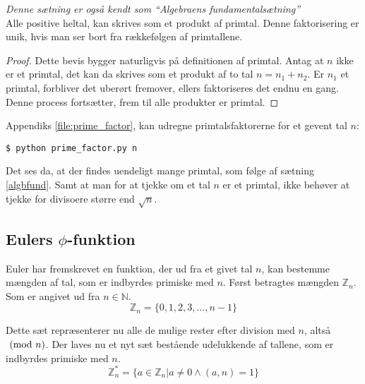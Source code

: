 %



\begin{sent}%
    \emph{Denne sætning er også kendt som ``Algebraens fundamentalsætning''}\\
    Alle positive heltal, kan skrives som et produkt af primtal.
    Denne faktorisering er unik, hvis man ser bort fra rækkefølgen af primtallene.
    \label{algbfund}
\end{sent}

\begin{proof}
    Dette bevis bygger naturligvis på definitionen af primtal.
    Antag at \(n\) ikke er et primtal, det kan da skrives som et produkt af to tal \(n = n_1 + n_2\).
    Er \(n_1\) et primtal, forbliver det uberørt fremover, ellers faktoriseres det endnu en gang.
    Denne process fortsætter, frem til alle produkter er primtal.
\end{proof}

Appendiks \ref{file:prime_factor}, kan udregne primtalsfaktorerne for et gevent tal \(n\):
\begin{verbatim}
$ python prime_factor.py n
\end{verbatim}

Det ses da, at der findes uendeligt mange primtal, som følge af sætning \ref{algbfund}.
Samt at man for at tjekke om et tal \(n\) er et primtal, ikke behøver at tjekke for divisoere større end \(\sqrt{n}\).


\subsection{Eulers \texorpdfstring{\(\phi\)}{Lg}-funktion}
Euler har fremskrevet en funktion, der ud fra et givet tal \(n\), kan bestemme mængden af tal, som er indbyrdes primiske med \(n\).
Først betragtes mængden \(\mathbb{Z}_n\). Som er angivet ud fra \(n \in \mathbb{N}\).
\[\mathbb{Z}_n = \{0, 1, 2, 3, \hdots, n-1 \}\]

Dette sæt repræsenterer nu alle de mulige rester efter division med \(n\), altså \(\ (\mathrm{mod}\ n)\).
Der laves nu et nyt sæt bestående udelukkende af tallene, som er indbyrdes primiske med \(n\).
\[\mathbb{Z}_n^* = \{a \in \mathbb{Z}_n | a \neq 0 \land (a, n) = 1\}\]

